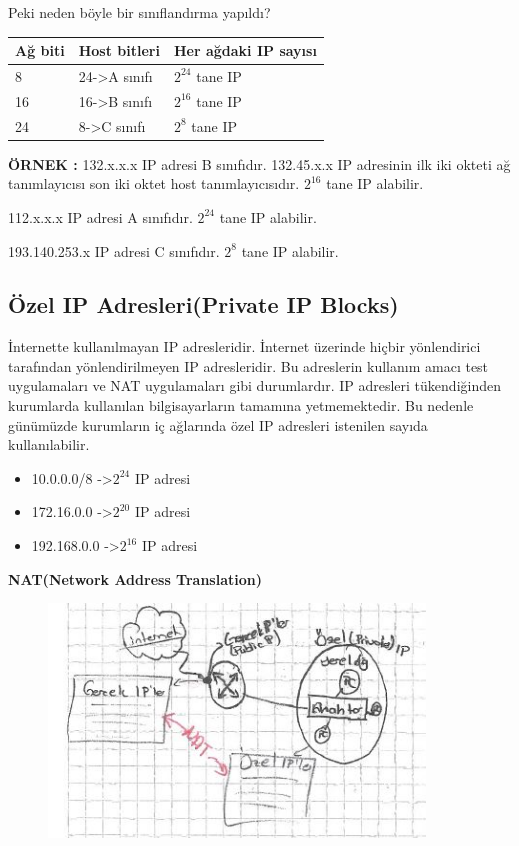 Peki neden böyle bir sınıflandırma yapıldı?

\begin{tabular}{l|l|l}
Ağ biti & Host bitleri & Her ağdaki IP sayısı \\
\hline
8& 24->A sınıfı &$2^{24}$ tane IP \\
16& 16->B sınıfı &$2^{16}$ tane IP \\
24&8->C sınıfı &$2^8$ tane IP \\

\end{tabular}

\textbf{ÖRNEK : } 132.x.x.x IP adresi B sınıfıdır.
132.45.x.x IP adresinin ilk iki okteti ağ tanımlayıcısı son iki oktet host tanımlayıcısıdır. $2^16$ tane IP alabilir. 

112.x.x.x IP adresi A sınıfıdır. $2^{24}$ tane IP alabilir.

193.140.253.x IP adresi C sınıfıdır. $2^8$ tane IP alabilir.


\subsection{Özel IP Adresleri(Private IP Blocks)}

İnternette kullanılmayan IP adresleridir. İnternet üzerinde hiçbir yönlendirici tarafından yönlendirilmeyen IP adresleridir. Bu adreslerin kullanım amacı test uygulamaları ve NAT uygulamaları gibi durumlardır. IP adresleri tükendiğinden kurumlarda kullanılan bilgisayarların tamamına yetmemektedir. Bu nedenle günümüzde kurumların iç ağlarında özel IP adresleri istenilen sayıda kullanılabilir. 

\begin{itemize}
\item 10.0.0.0/8 ->$2^{24}$ IP adresi
\item 172.16.0.0 ->$2^{20}$ IP adresi
\item 192.168.0.0 ->$2^{16}$ IP adresi
\end{itemize}

\textbf{NAT(Network Address Translation)}

\begin{figure}[!ht] \centering \includegraphics[width=10cm]{images/gorsel31sayfa} \label{fig:NAT} \end{figure}


